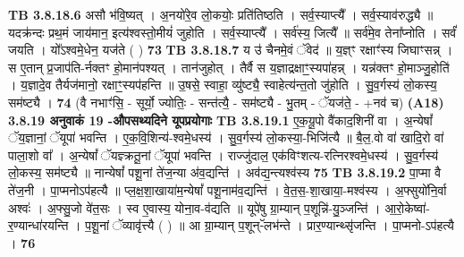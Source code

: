 \documentclass[17pt]{extarticle}
\begin{document}
{{{{{{{{{{{{{{{{{{{{{{                  \newline
                                \textbf{ TB 3.8.18.6} \newline
                  असौ भ॑वि॒ष्यत् । अ॒नयो॑रे॒व लो॒कयोः॒ प्रति॑तिष्ठति । सर्व॒स्याप्त्यै᳚ । सर्व॒स्याव॑रुद्ध्यै ॥ यदक्र॑न्दः प्रथ॒मं जाय॑मान॒ इत्य॑श्वस्तो॒मीयं॑ जुहोति । सर्व॒स्याप्त्यै᳚ । सर्व॑स्य॒ जित्यै᳚ ॥ सर्व॑मे॒व तेना᳚प्नोति । सर्वं॑ जयति । यो᳚ऽश्वमे॒धेन॒ यज॑ते ( ) \textbf{ 73} \newline
                  \newline
                                \textbf{ TB 3.8.18.7} \newline
                  य उ॑ चैनमे॒वं ॅवेद॑ ॥ य॒ज्ञ्ꣳ रक्षाꣳ॑स्य जिघाꣳसन्न् । स ए॒तान् प्र॒जाप॑ति-र्नक्तꣳ हो॒मान॑पश्यत् । तान॑जुहोत् । तैर्वै स य॒ज्ञाद्रक्षाꣳ॒॒स्यपा॑हन्न् । यन्न॑क्तꣳ हो॒माञ्जु॒होति॑ । य॒ज्ञादे॒व तैर्यज॑मानो॒ रक्षाꣳ॒॒स्यप॑हन्ति ॥ उ॒षसे॒ स्वाहा॒ व्यु॑ष्ट्यै॒ स्वाहेत्य॑न्त॒तो जु॑होति । सु॒व॒र्गस्य॑ लो॒कस्य॒ सम॑ष्ट्यै । \textbf{ 74} \newline
                  \newline
                                    (वै नभाꣳ॑सि॒ - सूर्यो॒ ज्योतिः॒ - सन्त॑त्यै॒ - सम॑ष्ट्यै - भु॒तम् - ॅयज॑ते॒ - +नव॑ च) \textbf{(A18)} \newline \newline
                \textbf{ 3.8.19    अनुवाकं   19 -औपसथ्यदिने यूपप्रयोगाः} \newline
                                \textbf{ TB 3.8.19.1} \newline
                  ए॒क॒यू॒पो वै॑काद॒शिनी॑ वा । अ॒न्येषां᳚ ॅय॒ज्ञानां॒ ॅयूपा॑ भवन्ति । ए॒क॒वि॒॒शिन्य॑-श्वमे॒धस्य॑ । सु॒व॒र्गस्य॑ लो॒कस्या॒-भिजि॑त्यै ॥ बै॒ल॒.वो वा॑ खादि॒रो वा॑ पाला॒शो वा᳚ । अ॒न्येषां᳚ ॅयज्ञ्क्रतू॒नां ॅयूपा॑ भवन्ति । राज्जु॑दाल॒ एक॑विꣳशत्य-रत्निरश्वमे॒धस्य॑ । सु॒व॒र्गस्य॑ लो॒कस्य॒ सम॑ष्ट्यै ॥ नान्येषां᳚ पशू॒नां ते॑ज॒न्या अ॑व॒द्यन्ति॑ । अव॑द्य॒न्त्यश्व॑स्य \textbf{ 75} \newline
                  \newline
                                \textbf{ TB 3.8.19.2} \newline
                  पा॒प्मा वै ते॑ज॒नी । पा॒प्मनोऽप॑हत्यै ॥ प्ल॒क्ष॒शा॒खाया॑म॒न्येषां᳚ पशू॒नाम॑व॒द्यन्ति॑ । वे॒त॒स॒-शा॒खाया॒-मश्व॑स्य । अ॒फ्सुयो॑नि॒र्वा अश्वः॑ । अ॒फ्सु॒जो वे॑त॒सः । स्व ए॒वास्य॒ योना॒व-व॑द्यति ॥ यूपे॑षु ग्रा॒म्यान् प॒शून्नि॑-यु॒ञ्जन्ति॑ । आ॒रो॒केष्वा॑-र॒ण्यान्धा॑रयन्ति । प॒शू॒नां ॅव्यावृ॑त्त्यै ( ) ॥ आ ग्रा॒म्यान् प॒शून्-ॅलभ॑न्ते । प्रार॒ण्यान्थ्सृ॑जन्ति । पा॒प्मनो-ऽप॑हत्यै । \textbf{ 76} \newline
}}}}}}}}}}}}}}}}}}}}}}
\end{document}
